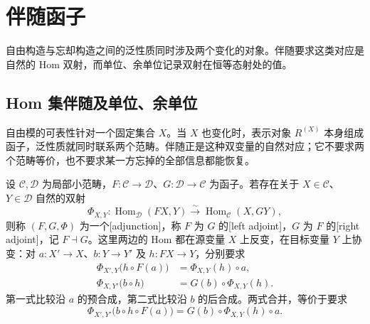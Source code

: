
\section{伴随函子}
\label{b4:sec:0303}

自由构造与忘却构造之间的泛性质同时涉及两个变化的对象。伴随要求这类对应是自然的 Hom 双射，而单位、余单位记录双射在恒等态射处的值。


%
%

\subsection{Hom 集伴随及单位、余单位}
\label{b4:subsec:0303:01}

自由模的可表性针对一个固定集合 \(X\)。当 \(X\) 也变化时，表示对象 \(R^{(X)}\) 本身组成函子，泛性质就同时联系两个范畴。伴随正是这种双变量的自然对应；它不要求两个范畴等价，也不要求某一方忘掉的全部信息都能恢复。

\begin{definition}\label{b4:def:adjunction}
	设 \(\mathcal C,\mathcal D\) 为局部小范畴，\(F:\mathcal C\rightarrow\mathcal D\)、\(G:\mathcal D\rightarrow\mathcal C\) 为函子。若存在关于 \(X\in\mathcal C\)、\(Y\in\mathcal D\) 自然的双射
	\[
		\Phi_{X,Y}:\operatorname{Hom}_{\mathcal D}(FX,Y) \xrightarrow{\sim}\operatorname{Hom}_{\mathcal C}(X,GY),
	\]
	则称 \((F,G,\Phi)\) 为一个[adjunction]，称 \(F\) 为 \(G\) 的[left adjoint]，\(G\) 为 \(F\) 的[right adjoint]，记 \(F\dashv G\)。这里两边的 Hom 都在源变量 \(X\) 上反变，在目标变量 \(Y\) 上协变：对 \(a:X'\rightarrow X\)、\(b:Y\rightarrow Y'\) 及 \(h:FX\rightarrow Y\)，分别要求
	\[
		\begin{aligned}
			\Phi_{X',Y}\bigl(h\circ F(a)\bigr) &=\Phi_{X,Y}(h)\circ a,\\
			\Phi_{X,Y'}\bigl(b\circ h\bigr) &=G(b)\circ\Phi_{X,Y}(h).
		\end{aligned}
	\]
	第一式比较沿 \(a\) 的预合成，第二式比较沿 \(b\) 的后合成。两式合并，等价于要求
	\begin{equation}\label{b4:eq:adjunction-naturality}
		\Phi_{X',Y'}\bigl(b\circ h\circ F(a)\bigr) =G(b)\circ\Phi_{X,Y}(h)\circ a.
	\end{equation}
\end{definition}

